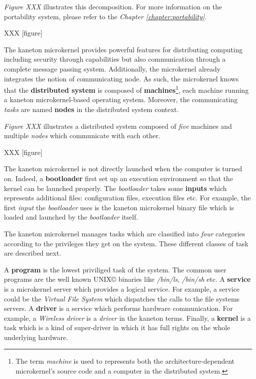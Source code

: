\textit{Figure XXX} illustrates this decomposition. For more information on
the portability system, please refer to the \textit{Chapter
\ref{chapter:portability}}.

XXX [figure]

The kaneton microkernel provides powerful features for distributing computing
including security through capabilities but also communication through a
complete message passing system. Additionally, the microkernel already
integrates the notion of communicating node. As such, the microkernel knows
that the \textbf{distributed system} is composed of
  \textbf{machines}\footnote{The term \textit{machine} is used to represents
                             both the architecture-dependent microkernel's
                             source code and a computer in the distributed
                             system.},
each machine running a kaneton microkernel-based operating system. Moreover,
the communicating \textit{tasks} are named \textbf{nodes} in the distributed
system context.

\textit{Figure XXX} illustrates a distributed system composed of \textit{five}
machines and multiple \textit{nodes} which communicate with each other.

XXX [figure]

The kaneton microkernel is not directly launched when the computer is
turned on. Indeed, a \textbf{bootloader} first set up an execution environment
so that the kernel can be launched properly. The \textit{bootloader} takes
some \textbf{inputs} which represents additional files: configuration
files, execution files etc. For example, the first \textit{input} the
\textit{bootloader} uses is the kaneton microkernel binary file which is
loaded and launched by the \textit{bootloader} itself.

The kaneton microkernel manages tasks which are classified into \textit{four}
categories according to the privileges they get on the system. These different
classes of task are described next.

A \textbf{program} is the lowest priviliged task of the system. The common
user programs are the well known UNIX{\copyright} binaries like
\textit{/bin/ls}, \textit{/bin/sh} etc. A \textbf{service} is a microkernel
server which provides a logical service. For example, a service could be the
\textit{Virtual File System} which dispatches the calls to the file systems
servers. A \textbf{driver} is a service which performs hardware communication.
For example, a \textit{Wireless driver} is a \textit{driver} in the kaneton
terms. Finally, a \textbf{kernel} is a task which is a kind of super-driver
in which it has full rights on the whole underlying hardware.

